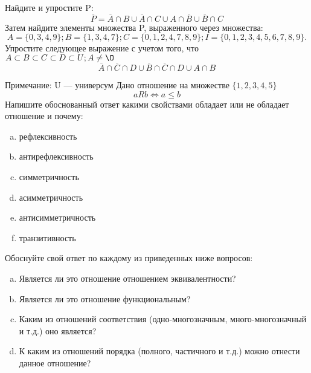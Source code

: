 \documentclass[10pt]{exam}
\begin{document}
\begin{questions}
\question
Найдите и упростите P:
\begin{equation*}
\overline{P} = \overline{A} \cap B \cup \overline{A} \cap C \cup A \cap \overline{B} \cup \overline{B} \cap C
\end{equation*}
Затем найдите элементы множества P, выраженного через множества:
\begin{equation*}
A = \{0, 3, 4, 9\}; 
B = \{1, 3, 4, 7\};
C = \{0, 1, 2, 4, 7, 8, 9\};
I = \{0, 1, 2, 3, 4, 5, 6, 7, 8, 9\}.
\end{equation*}\question
Упростите следующее выражение с учетом того, что $A\subset B \subset C \subset D \subset U; A \neq \O$
\begin{equation*}
\overline{A} \cap \overline{C} \cap D \cup \overline{B} \cap \overline{C} \cap D \cup A \cap B
\end{equation*}

Примечание: U — универсум\question
Дано отношение на множестве $\{1, 2, 3, 4, 5\}$ 
\begin{equation*}
aRb \iff a \leq b
\end{equation*}
Напишите обоснованный ответ какими свойствами обладает или не обладает отношение и почему:   
\begin{enumerate} [a)]\setcounter{enumi}{0}
\item рефлексивность
\item антирефлексивность
\item симметричность
\item асимметричность
\item антисимметричность
\item транзитивность
\end{enumerate}

Обоснуйте свой ответ по каждому из приведенных ниже вопросов:
\begin{enumerate} [a)]\setcounter{enumi}{0}
    \item Является ли это отношение отношением эквивалентности?
    \item Является ли это отношение функциональным?
    \item Каким из отношений соответствия (одно-многозначным, много-многозначный и т.д.) оно является?
    \item К каким из отношений порядка (полного, частичного и т.д.) можно отнести данное отношение?
\end{enumerate}



\end{questions}
\end{document}
